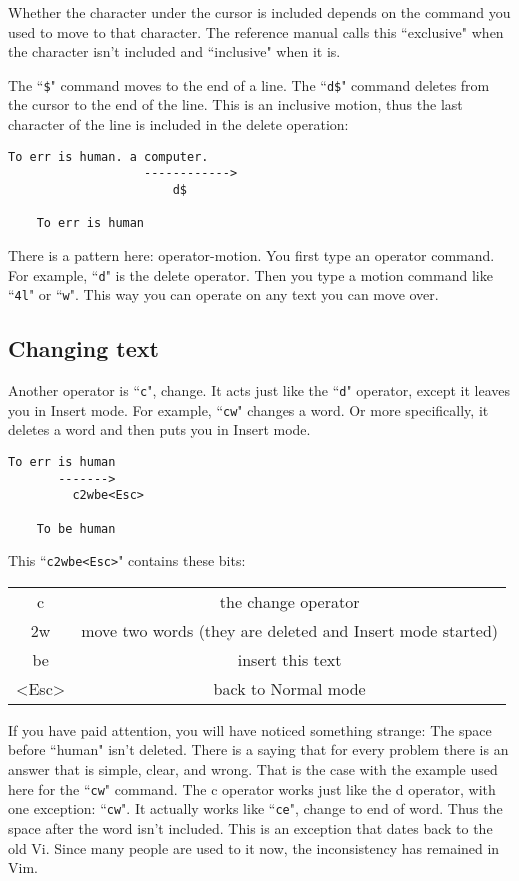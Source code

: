 Whether the character under the cursor is included depends on the command you used to move to that character.
The reference manual calls this ``exclusive" when the character isn't included and ``inclusive" when it is.

The ``\texttt{\$}" command moves to the end of a line.
The ``\texttt{d\$}" command deletes from the cursor to the end of the line.
This is an inclusive motion, thus the last character of the line is included in the delete operation:

\begin{Verbatim}[samepage=true]
    To err is human. a computer.
                   ------------>
                       d$

    To err is human
\end{Verbatim}

There is a pattern here: operator-motion.
You first type an operator command.
For example, ``\texttt{d}" is the delete operator.
Then you type a motion command like ``\texttt{4l}" or ``\texttt{w}".
This way you can operate on any text you can move over.

\subsection{Changing text}

Another operator is ``\texttt{c}", change.
It acts just like the ``\texttt{d}" operator, except it leaves you in Insert mode.
For example, ``\texttt{cw}" changes a word.
Or more specifically, it deletes a word and then puts you in Insert mode.

\begin{Verbatim}[samepage=true]
    To err is human
       ------->
         c2wbe<Esc>

    To be human
\end{Verbatim}

This ``\texttt{c2wbe<Esc>}" contains these bits:
\begin{center}
\begin{tabular}{c c}
				c & the change operator\\
				2w & move two words (they are deleted and Insert mode started)\\
				be & insert this text\\
				<Esc> & back to Normal mode\\
\end{tabular}
\end{center}

If you have paid attention, you will have noticed something strange: The space before ``human" isn't deleted.
There is a saying that for every problem there is an answer that is simple, clear, and wrong.
That is the case with the example used here for the ``\texttt{cw}" command.
The c operator works just like the d operator, with one exception: ``\texttt{cw}".
It actually works like ``\texttt{ce}", change to end of word.
Thus the space after the word isn't included.
This is an exception that dates back to the old Vi.
Since many people are used to it now, the inconsistency has remained in Vim.

